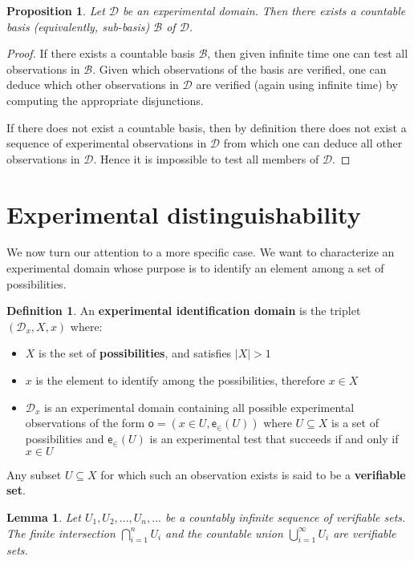 \documentclass[review]{elsarticle}
\theoremstyle{plain}%
\newtheorem{lem}[thm]{Lemma}
\newtheorem{prop}[thm]{Proposition}
\theoremstyle{definition}
\newtheorem{defn}{Definition}[section]
\theoremstyle{remark}
\begin{document}
\begin{prop}
Let $\mathcal{D}$ be an experimental domain. Then there exists a countable basis (equivalently, sub-basis) $\mathcal{B}$ of $\mathcal{D}$.
\end{prop}

\begin{proof}
If there exists a countable basis $\mathcal{B}$, then given infinite time one can test all observations in $\mathcal{B}$. Given which observations of the basis are verified, one can deduce which other observations in $\mathcal{D}$ are verified (again using infinite time) by computing the appropriate disjunctions. 

If there does not exist a countable basis, then by definition there does not exist a sequence of experimental observations in $\mathcal{D}$ from which one can deduce all other observations in $\mathcal{D}$. Hence it is impossible to test all members of $\mathcal{D}$.
\end{proof}

\section{Experimental distinguishability}

We now turn our attention to a more specific case. We want to characterize an experimental domain whose purpose is to identify an element among a set of possibilities.

\begin{defn}
	An \textbf{experimental identification domain} is the triplet $(\mathcal{D}_x, X, x)$ where:
	\begin{itemize}
		\item $X$ is the set of \textbf{possibilities}, and satisfies $|X|>1$
		\item $x$ is the element to identify among the possibilities, therefore $x \in X$
		\item $\mathcal{D}_x$ is an experimental domain containing all possible experimental observations of the form $\mathsf{o} = (x\in U, \mathsf{e}_\in(U))$ where $U \subseteq X$ is a set of possibilities and $\mathsf{e}_\in(U)$ is an experimental test that succeeds if and only if $x \in U$
	\end{itemize}
	Any subset $U\subseteq X$ for which such an observation exists is said to be a \textbf{verifiable set}.
\end{defn}

\begin{lem}
\label{setbehavior}
	Let $U_1, U_2, ... , U_n, ...$ be a countably infinite sequence of verifiable sets. The finite intersection $\bigcap\limits_{i=1}^{n} U_i$ and the countable union $\bigcup\limits_{i=1}^{\infty} U_i$ are verifiable sets.
\end{lem}
\end{document}
